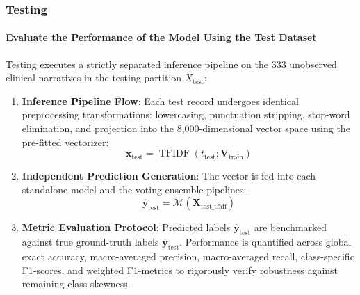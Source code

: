 \subsubsection{Testing}

\paragraph{Evaluate the Performance of the Model Using the Test Dataset}
Testing executes a strictly separated inference pipeline on the 333 unobserved clinical narratives in the testing partition $X_{\text{test}}$:

\begin{enumerate}
    \item \textbf{Inference Pipeline Flow}:
    Each test record undergoes identical preprocessing transformations: lowercasing, punctuation stripping, stop-word elimination, and projection into the 8,000-dimensional vector space using the pre-fitted vectorizer:
    \begin{equation}
        \mathbf{x}_{\text{test}} = \operatorname{TFIDF}(t_{\text{test}}; \mathbf{V}_{\text{train}})
    \end{equation}
    \item \textbf{Independent Prediction Generation}:
    The vector is fed into each standalone model and the voting ensemble pipelines:
    \begin{equation}
        \hat{\mathbf{y}}_{\text{test}} = \mathcal{M}(\mathbf{X}_{\text{test\_tfidf}})
    \end{equation}
    \item \textbf{Metric Evaluation Protocol}:
    Predicted labels $\hat{\mathbf{y}}_{\text{test}}$ are benchmarked against true ground-truth labels $\mathbf{y}_{\text{test}}$. Performance is quantified across global exact accuracy, macro-averaged precision, macro-averaged recall, class-specific F1-scores, and weighted F1-metrics to rigorously verify robustness against remaining class skewness.
\end{enumerate}
